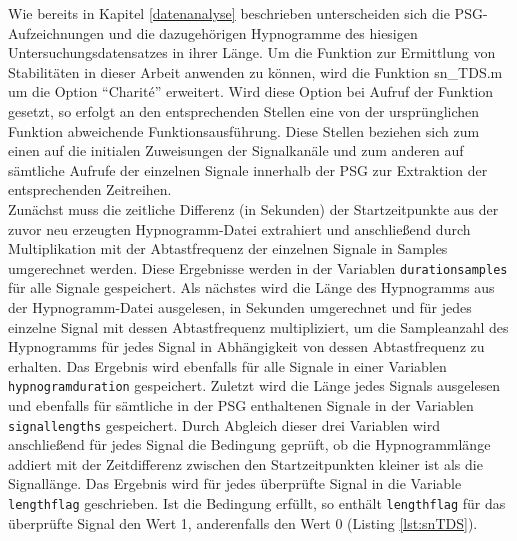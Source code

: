 Wie bereits in Kapitel \ref{datenanalyse} beschrieben unterscheiden sich die \acs{PSG}-Aufzeichnungen und die dazugehörigen Hypnogramme des hiesigen Untersuchungsdatensatzes in ihrer Länge. Um die Funktion zur Ermittlung von Stabilitäten in dieser Arbeit anwenden zu können, wird die Funktion sn\_TDS.m um die Option "`Charit\'{e}"' erweitert. Wird diese Option bei Aufruf der Funktion gesetzt, so erfolgt an den entsprechenden Stellen eine von der ursprünglichen Funktion abweichende Funktionsausführung. Diese Stellen beziehen sich zum einen auf die initialen Zuweisungen der Signalkanäle und zum anderen auf sämtliche Aufrufe der einzelnen Signale innerhalb der \acs{PSG} zur Extraktion der entsprechenden Zeitreihen.\\

Zunächst muss die zeitliche Differenz (in Sekunden) der Startzeitpunkte aus der zuvor neu erzeugten Hypnogramm-Datei extrahiert und anschließend durch Multiplikation mit der Abtastfrequenz der einzelnen Signale in Samples umgerechnet werden. Diese Ergebnisse werden in der Variablen \texttt{durationsamples} für alle Signale gespeichert. Als nächstes wird die Länge des Hypnogramms aus der Hypnogramm-Datei ausgelesen, in Sekunden umgerechnet und für jedes einzelne Signal mit dessen Abtastfrequenz multipliziert, um die Sampleanzahl des Hypnogramms für jedes Signal in Abhängigkeit von dessen Abtastfrequenz zu erhalten. Das Ergebnis wird ebenfalls für alle Signale in einer Variablen \texttt{hypnogramduration} gespeichert. Zuletzt wird die Länge jedes Signals ausgelesen und ebenfalls für sämtliche in der \acs{PSG} enthaltenen Signale in der Variablen \texttt{signallengths} gespeichert. Durch Abgleich dieser drei Variablen wird anschließend für jedes Signal die Bedingung geprüft, ob die Hypnogrammlänge addiert mit der Zeitdifferenz zwischen den Startzeitpunkten kleiner ist als die Signallänge. Das Ergebnis wird für jedes überprüfte Signal in die Variable \texttt{lengthflag} geschrieben. Ist die Bedingung erfüllt, so enthält \texttt{lengthflag} für das überprüfte Signal den Wert 1, anderenfalls den Wert 0 (Listing \ref{lst:snTDS}).\\

